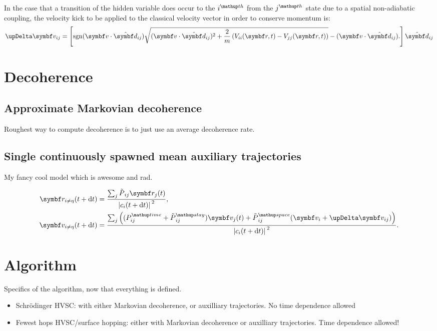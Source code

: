 In the case that a transition of the hidden variable does occur to the $i^\up{th}$ from the $j^\up{th}$ state due to a spatial non-adiabatic coupling, the velocity kick to be applied to the classical velocity vector in order to conserve momentum is:
\begin{align}
\upDelta \vec v_{ij} = \left[\sgn(\vec v\cdot \hat{\vec d}_{ij})
\sqrt{(\vec v\cdot \hat{\vec d}_{ij})^2 + \frac2m\left(V_{ii}(\vec r, t) - V_{jj}(\vec r, t)\right)} - (\vec v\cdot \hat{\vec d}_{ij}).
\right]\hat{\vec d}_{ij}
\end{align}   

\section{Decoherence}

\subsection{Approximate Markovian decoherence}

Roughest way to compute decoherence is to just use an average decoherence rate.
\subsection{Single continuously spawned mean auxiliary trajectories}

My fancy cool model which is awesome and rad.

\begin{align}
\vec r_{i\neq\eta}(t + \dd t) &= \frac{\sum_j \tilde P_{ij}\vec r_j(t)}
{\abs{c_i(t+\dd t)}^2},\\
\vec v_{i\neq\eta}(t + \dd t) &= \frac{\sum_j 
\left((P^\up{time}_{ij} + \tilde P^\up{stay}_{ij})\vec v_j(t)
+ \tilde P^\up{space}_{ij}(\vec v_i + \upDelta \vec v_{ij})\right)}
{\abs{c_i(t+\dd t)}^2}.
\end{align}
\section{Algorithm}

Specifics of the algorithm, now that everything is defined.
\begin{itemize}
    \item Schr\"odinger HVSC: with either Markovian decoherence, or auxilliary trajectories. No time dependence allowed

    \item Fewest hops HVSC/surface hopping: either with Markovian decoherence or
    auxilliary trajectories. Time dependence allowed!

\end{itemize}
